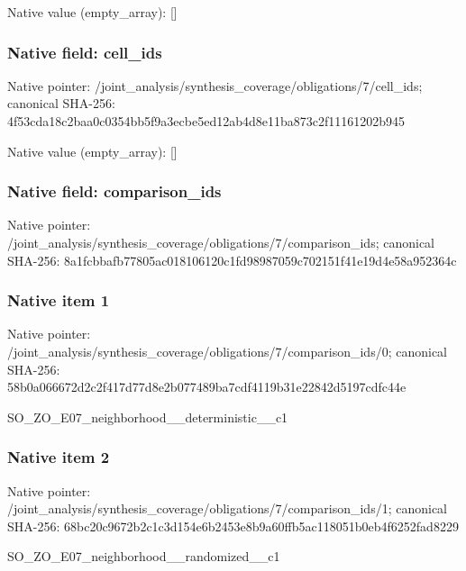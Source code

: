 \documentclass[10pt,a4paper]{article}
\begin{document}
Native value (empty\_\allowbreak{}array): []

\subsubsection{Native field: cell\_\allowbreak{}ids}
Native pointer: /joint\_\allowbreak{}analysis/synthesis\_\allowbreak{}coverage/obligations/7/cell\_\allowbreak{}ids; canonical SHA-256: 4f53cda18c2baa0c0354bb5f9a3ecbe5ed12ab4d8e11ba873c2f11161202b945

Native value (empty\_\allowbreak{}array): []

\subsubsection{Native field: comparison\_\allowbreak{}ids}
Native pointer: /joint\_\allowbreak{}analysis/synthesis\_\allowbreak{}coverage/obligations/7/comparison\_\allowbreak{}ids; canonical SHA-256: 8a1fcbbafb77805ac018106120c1fd98987059c702151f41e19d4e58a952364c

\subsubsection{Native item 1}
Native pointer: /joint\_\allowbreak{}analysis/synthesis\_\allowbreak{}coverage/obligations/7/comparison\_\allowbreak{}ids/0; canonical SHA-256: 58b0a066672d2c2f417d77d8e2b077489ba7cdf4119b31e22842d5197cdfc44e

\begingroup\raggedright\sloppy SO\_\allowbreak{}ZO\_\allowbreak{}E07\_\allowbreak{}neighborhood\_\allowbreak{}\_\allowbreak{}deterministic\_\allowbreak{}\_\allowbreak{}c1\par\endgroup

\subsubsection{Native item 2}
Native pointer: /joint\_\allowbreak{}analysis/synthesis\_\allowbreak{}coverage/obligations/7/comparison\_\allowbreak{}ids/1; canonical SHA-256: 68bc20c9672b2c1c3d154e6b2453e8b9a60ffb5ac118051b0eb4f6252fad8229

\begingroup\raggedright\sloppy SO\_\allowbreak{}ZO\_\allowbreak{}E07\_\allowbreak{}neighborhood\_\allowbreak{}\_\allowbreak{}randomized\_\allowbreak{}\_\allowbreak{}c1\par\endgroup
\end{document}
